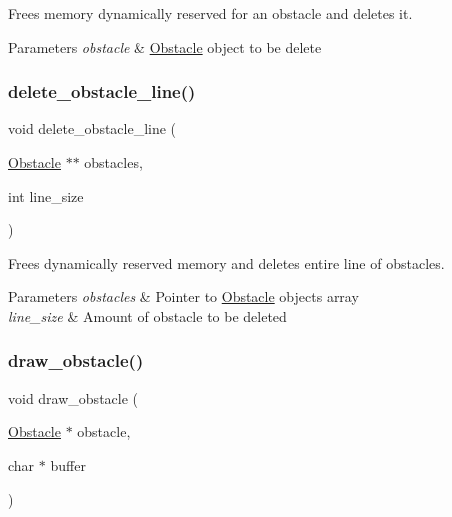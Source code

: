 Frees memory dynamically reserved for an obstacle and deletes it. 


\begin{DoxyParams}{Parameters}
{\em obstacle} & \hyperlink{struct_obstacle}{Obstacle} \textquotesingle{}object\textquotesingle{} to be delete \\
\hline
\end{DoxyParams}
\hypertarget{group__obstacle_gae44a832d131dcfc9009804066fd5fdf3}{}\label{group__obstacle_gae44a832d131dcfc9009804066fd5fdf3} 
\subsubsection{\texorpdfstring{delete\+\_\+obstacle\+\_\+line()}{delete\_obstacle\_line()}}
{\footnotesize\ttfamily void delete\+\_\+obstacle\+\_\+line (\begin{DoxyParamCaption}\item[{\hyperlink{struct_obstacle}{Obstacle} $\ast$$\ast$}]{obstacles,  }\item[{int}]{line\+\_\+size }\end{DoxyParamCaption})}



Frees dynamically reserved memory and deletes entire line of obstacles. 


\begin{DoxyParams}{Parameters}
{\em obstacles} & Pointer to \hyperlink{struct_obstacle}{Obstacle} \textquotesingle{}objects\textquotesingle{} array \\
\hline
{\em line\+\_\+size} & Amount of obstacle to be deleted \\
\hline
\end{DoxyParams}
\hypertarget{group__obstacle_ga9d4a8c6e21f6ef41233418d870b4a9c4}{}\label{group__obstacle_ga9d4a8c6e21f6ef41233418d870b4a9c4} 
\subsubsection{\texorpdfstring{draw\+\_\+obstacle()}{draw\_obstacle()}}
{\footnotesize\ttfamily void draw\+\_\+obstacle (\begin{DoxyParamCaption}\item[{\hyperlink{struct_obstacle}{Obstacle} $\ast$}]{obstacle,  }\item[{char $\ast$}]{buffer }\end{DoxyParamCaption})}



